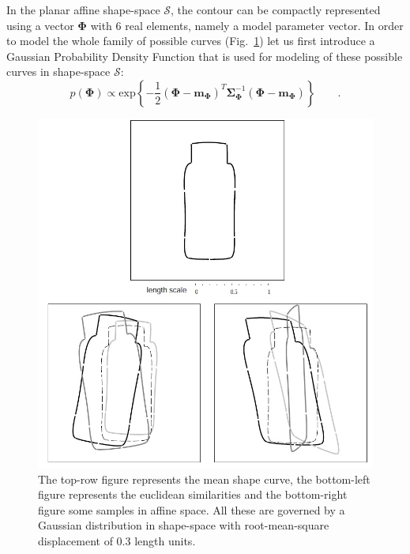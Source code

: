 \documentclass[conference]{IEEEtran}
\begin{document}
In the planar affine shape-space $\mathcal{S}$, the contour can be compactly 
represented using a vector $\mathbf{\Phi}$ with 6 real elements, namely a model
parameter vector. In order to model the whole family of
possible curves (Fig.~\ref{fig:transform}) let us first
introduce a Gaussian Probability Density Function that is used for modeling 
of these possible curves in shape-space $\mathcal{S}$:
\begin{equation}
  \label{eq:prior}
   p(\mathbf{\Phi}) \propto
\mathrm{exp} \left\{ -\frac{1}{2} (\mathbf{\Phi} -
  \mathbf{m}_{\mathbf{\Phi}})^T \mathbf{\Sigma}_{\mathbf{\Phi}}^{-1} (\mathbf{\Phi} -
  \mathbf{m}_{\mathbf{\Phi}}) \right\}\qquad.
\end{equation}
\begin{figure}[htb]
  \centering
  \includegraphics[width=\columnwidth]{images/prior.jpg}
\caption{The top-row figure represents the mean shape curve, 
  the bottom-left figure represents the euclidean
  similarities and the bottom-right figure
  some samples in affine space. All these are governed by a
  Gaussian distribution in shape-space with root-mean-square
  displacement of 0.3 length units.}
\label{fig:transform}
\end{figure}
\end{document}
